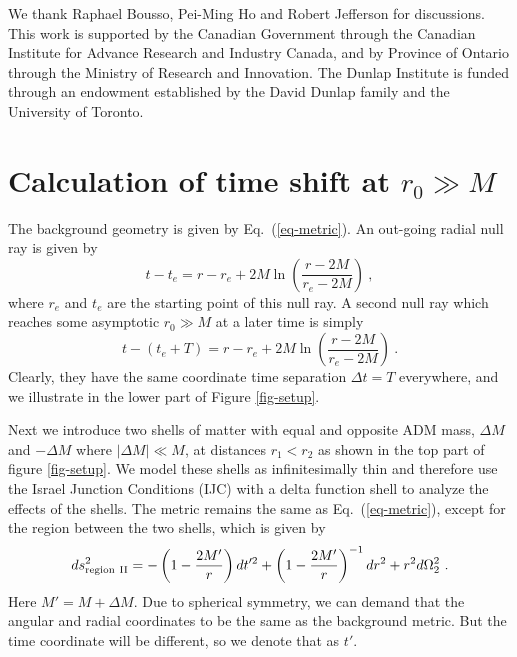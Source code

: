 \documentclass[aps,showpacs,onecolumn,floats,prd,superscriptaddress,nofootinbib]{revtex4-1}
\begin{document}
\acknowledgments

We thank Raphael Bousso, Pei-Ming Ho and Robert Jefferson for discussions. 
This work is supported by the Canadian Government through the Canadian Institute for Advance Research and Industry Canada, 
and by Province of Ontario through the Ministry of Research and Innovation. 
The Dunlap Institute is funded through an endowment established by the David Dunlap family and the University of Toronto.

\appendix

\section{Calculation of time shift at $r_0\gg M$}
\label{Dtime}

The background geometry is given by Eq.~(\ref{eq-metric}).
An out-going radial null ray is given by
\begin{equation}
	t - t_e = r - r_e + 2M \ln \left( \frac{r - 2M}{r_e - 2M}  \right)~,
	\label{3}
\end{equation}
where $r_e$ and $t_e$ are the starting point of this null ray.
A second null ray which reaches some asymptotic $r_0\gg M$ at a later time is simply
\begin{equation}
	t - (t_e + T) = r - r_e + 2M \ln \left( \frac{r - 2M}{r_e - 2M}  \right)~.
\end{equation}
Clearly, they have the same coordinate time separation $\Delta t = T$ everywhere, and we illustrate in the lower part of Figure \ref{fig-setup}.

Next we introduce two shells of matter with equal and opposite ADM mass, $\Delta M$ and $-\Delta M$ where $|\Delta M| \ll M$, at distances $r_1 < r_2$ as shown in the top part of figure \ref{fig-setup}. 
We model these shells as infinitesimally thin and therefore use the Israel Junction Conditions (IJC) \cite{Isr66} with a delta function shell to analyze the effects of the shells. 
The metric remains the same as Eq.~(\ref{eq-metric}), except for the region between the two shells, which is given by
\begin{equation}
	ds^2_{\rm region \ II} = - \left( 1 - \frac{2M'}{r} \right) d t'^2 + \left( 1 - \frac{2M'}{r} \right)^{-1} dr^2 + r^2 d \Omega_2^2~.	\label{2}
\end{equation}
Here $M' = M + \Delta M$. 
Due to spherical symmetry, we can demand that the angular and radial coordinates to be the same as the background metric. 
But the time coordinate will be different, so we denote that as $t'$.
\end{document}
